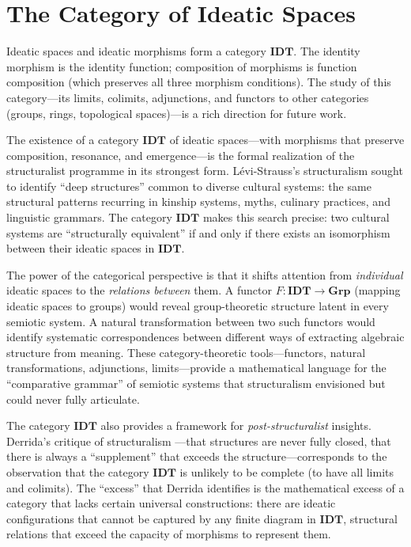 \section{The Category of Ideatic Spaces}

\begin{remark}
Ideatic spaces and ideatic morphisms form a category $\mathbf{IDT}$.
The identity morphism is the identity function; composition of morphisms
is function composition (which preserves all three morphism conditions).
The study of this category---its limits, colimits, adjunctions, and
functors to other categories (groups, rings, topological spaces)---is a
rich direction for future work.
\end{remark}

\begin{interpretation}\label{interp:ch7:category_structuralism}
The existence of a category $\mathbf{IDT}$ of ideatic spaces---with
morphisms that preserve composition, resonance, and emergence---is the
formal realization of the structuralist programme in its strongest form.
Lévi-Strauss's structuralism sought to identify ``deep structures'' common
to diverse cultural systems: the same structural patterns recurring in
kinship systems, myths, culinary practices, and linguistic grammars. The
category $\mathbf{IDT}$ makes this search precise: two cultural systems
are ``structurally equivalent'' if and only if there exists an isomorphism
between their ideatic spaces in $\mathbf{IDT}$.

The power of the categorical perspective is that it shifts attention from
\emph{individual} ideatic spaces to the \emph{relations between} them.
A functor $F : \mathbf{IDT} \to \mathbf{Grp}$ (mapping ideatic spaces
to groups) would reveal group-theoretic structure latent in every
semiotic system. A natural transformation between two such functors
would identify systematic correspondences between different ways of
extracting algebraic structure from meaning. These category-theoretic
tools---functors, natural transformations, adjunctions, limits---provide
a mathematical language for the ``comparative grammar'' of semiotic
systems that structuralism envisioned but could never fully articulate.

The category $\mathbf{IDT}$ also provides a framework for
\emph{post-structuralist} insights. Derrida's critique of structuralism
---that structures are never fully closed, that there is always a
``supplement'' that exceeds the structure---corresponds to the observation
that the category $\mathbf{IDT}$ is unlikely to be complete (to have all
limits and colimits). The ``excess'' that Derrida identifies is the
mathematical excess of a category that lacks certain universal
constructions: there are ideatic configurations that cannot be captured
by any finite diagram in $\mathbf{IDT}$, structural relations that exceed
the capacity of morphisms to represent them.
\end{interpretation}

